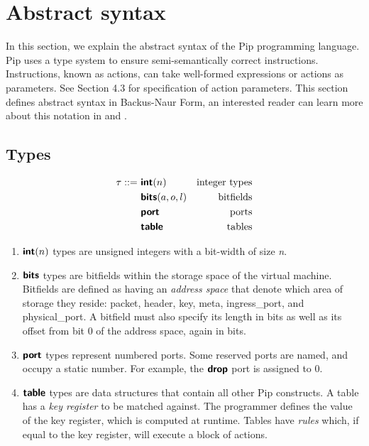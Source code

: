 
\section{Abstract syntax}
In this section, we explain the abstract syntax of the Pip programming
language. 
Pip uses a type system to ensure semi-semantically correct instructions. Instructions, known as actions, can take well-formed expressions or actions as parameters. See Section 4.3 for specification of action parameters. This section defines abstract syntax in Backus-Naur Form, an interested reader can learn more about this notation in \Cite{Aho2007} and \Cite{Pierce2000}.

\subsection{Types}

\begin{align*}
\tau ::=~& \bm{\mathsf{{int}}}(n)        & \text{integer types} \\
         & \bm{\mathsf{{bits}}}(a, o, l) & \text{bitfields} \\
         & \bm{\mathsf{{port}}}          & \text{ports} \\
         & \bm{\mathsf{{table}}}         & \text{tables} \\
\end{align*}

\begin{enumerate}
\item $\bm{\mathsf{{int}}}(n)$ types are unsigned integers with a bit-width of size \textit{n}.
\item $\bm{\mathsf{{bits}}}$ types are bitfields within the storage space of the virtual machine. Bitfields are defined as having an \textit{address space} that denote which area of storage they reside: packet, header, key, meta, ingress\_port, and physical\_port. A bitfield must also specify its length in bits as well as its offset from bit 0 of the address space, again in bits.
\item $\bm{\mathsf{{port}}}$ types represent numbered ports. Some reserved ports are named, and occupy a static number. For example, the $\bm{\mathsf{{drop}}}$ port is assigned to 0.
\item $\bm{\mathsf{{table}}}$ types are data structures that contain all other Pip constructs. A table has a \textit{key register} to be matched against. The programmer defines the value of the key register, which is computed at runtime. Tables have \textit{rules} which, if equal to the key register, will execute a block of actions.
\end{enumerate}

